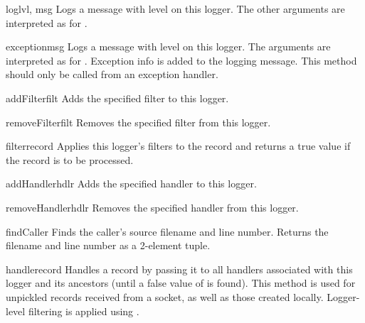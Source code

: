 \begin{methoddesc}{log}{lvl, msg}
Logs a message with level  on this logger.
The other arguments are interpreted as for .
\end{methoddesc}

\begin{methoddesc}{exception}{msg}
Logs a message with level  on this logger.
The arguments are interpreted as for . Exception info
is added to the logging message. This method should only be called
from an exception handler.
\end{methoddesc}

\begin{methoddesc}{addFilter}{filt}
Adds the specified filter  to this logger.
\end{methoddesc}

\begin{methoddesc}{removeFilter}{filt}
Removes the specified filter  from this logger.
\end{methoddesc}

\begin{methoddesc}{filter}{record}
Applies this logger's filters to the record and returns a true value if
the record is to be processed.
\end{methoddesc}

\begin{methoddesc}{addHandler}{hdlr}
Adds the specified handler  to this logger.
\end{methoddesc}

\begin{methoddesc}{removeHandler}{hdlr}
Removes the specified handler  from this logger.
\end{methoddesc}

\begin{methoddesc}{findCaller}{}
Finds the caller's source filename and line number. Returns the filename
and line number as a 2-element tuple.
\end{methoddesc}

\begin{methoddesc}{handle}{record}
Handles a record by passing it to all handlers associated with this logger
and its ancestors (until a false value of  is found).
This method is used for unpickled records received from a socket, as well
as those created locally. Logger-level filtering is applied using
.
\end{methoddesc}

